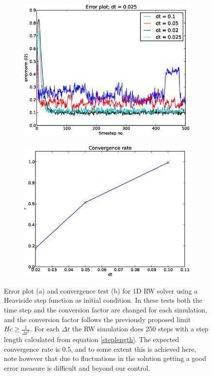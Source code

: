 \begin{figure}[H]
 \centering
\begin{subfigure}[t]{0.49\textwidth}
 \includegraphics[width=\textwidth]{../doc/results/experiment_01052014_1615_Redoing_RW_tests/results/errorplot.eps}
 \caption{}
 \label{ConvergenceTestRW:dt:errorplot}
\end{subfigure}
 \begin{subfigure}[t]{0.49\textwidth}
 \includegraphics[width=\textwidth]{../doc/results/experiment_01052014_1615_Redoing_RW_tests/results/ConvergenceTest.eps}
  \caption{}
 \label{ConvergenceTestRW:dt:convergence}
\end{subfigure}
\caption[]{Error plot (a) and convergence test (b) for 1D RW solver using a Heaviside step function as initial condition. In these tests both the time step and the conversion factor are changed for each simulation, and the conversion factor follows the previously proposed limit $Hc\geq\frac{1}{\Delta t^2}$. For each $\Delta t$ the RW simulation does 250 steps with a step length calculated from equation \eqref{steplength}. The expected convergence rate is $0.5$, and to some extent this is achieved here, note however that due to fluctuations in the solution getting a good error measure is difficult and beyond our control.}
 \label{ConvergenceTestRW:dt}
\end{figure}

